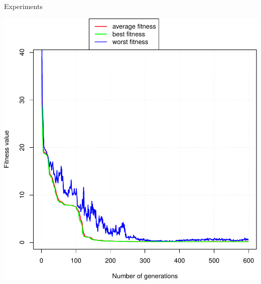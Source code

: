 \documentclass[10pt,xcolor=pdflatex]{beamer}
\begin{document}
\begin{frame}{Experiments}
    \centerline{\includegraphics[scale=0.45]{evolution-course}}
\end{frame}
\end{document}
